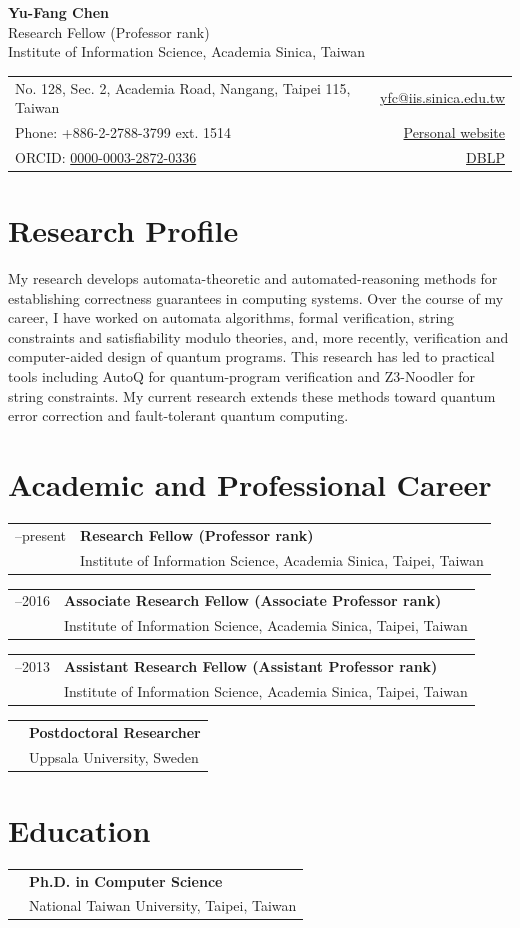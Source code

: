 \documentclass[11pt,a4paper]{article}
\makeatletter
\newcommand{\careerentry}[3]{\begin{tabularx}{\textwidth}{@{}>{\raggedright\arraybackslash\color{muted}\sffamily}p{0.17\textwidth}X@{}}#1 & \textbf{#2}\\[-0.05em] & #3\end{tabularx}\vspace{0.45em}}
\makeatother
\begin{document}
\begin{center}
{\LARGE\sffamily\bfseries Yu-Fang Chen}\\[0.3em]
{\large Research Fellow (Professor rank)}\\[0.15em]
Institute of Information Science, Academia Sinica, Taiwan
\end{center}
\vspace{0.2em}
\begin{tabularx}{\textwidth}{@{}Xr@{}}
No. 128, Sec. 2, Academia Road, Nangang, Taipei 115, Taiwan & \href{mailto:yfc@iis.sinica.edu.tw}{yfc@iis.sinica.edu.tw}\\
Phone: +886-2-2788-3799 ext. 1514 & \href{https://iis.sinica.edu.tw/~yfc}{Personal website}\\
ORCID: \href{https://orcid.org/0000-0003-2872-0336}{0000-0003-2872-0336} & \href{https://dblp.org/pid/76/1885}{DBLP}
\end{tabularx}

\section{Research Profile}
My research develops automata-theoretic and automated-reasoning methods for establishing correctness guarantees in computing systems. Over the course of my career, I have worked on automata algorithms, formal verification, string constraints and satisfiability modulo theories, and, more recently, verification and computer-aided design of quantum programs. This research has led to practical tools including AutoQ for quantum-program verification and Z3-Noodler for string constraints. My current research extends these methods toward quantum error correction and fault-tolerant quantum computing.

\section{Academic and Professional Career}
\careerentry{2016--present}{Research Fellow (Professor rank)}{Institute of Information Science, Academia Sinica, Taipei, Taiwan}
\careerentry{2013--2016}{Associate Research Fellow (Associate Professor rank)}{Institute of Information Science, Academia Sinica, Taipei, Taiwan}
\careerentry{2009--2013}{Assistant Research Fellow (Assistant Professor rank)}{Institute of Information Science, Academia Sinica, Taipei, Taiwan}
\careerentry{2009}{Postdoctoral Researcher}{Uppsala University, Sweden}

\section{Education}
\careerentry{2008}{Ph.D. in Computer Science}{National Taiwan University, Taipei, Taiwan}
\end{document}

